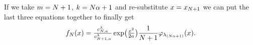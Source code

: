 If we take \(m=N+1\), \(k=N\alpha+1\) and re-substitute
\(x=x_{N+1}\) we can put the last three equations together to finally
get
\[
	f_N(x)
	= \tfrac{c^\lambda_{N, a}}{c^\lambda_{N+1,a}}
	\exp\bigl(\tfrac{x^2}{2a}\bigr)
	\frac1{N+1}\varphi_{\lambda_{(N\alpha+1)}}(x).
\]





